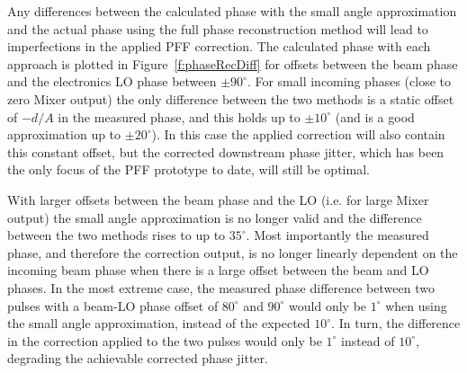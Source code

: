 Any differences between the calculated phase with the small angle
approximation and the actual phase using the full phase reconstruction
 method will lead to imperfections in the applied PFF correction.
The calculated phase with each approach is plotted in Figure~\ref{f:phaseRecDiff} for offsets between the beam phase and the electronics LO phase between \(\pm90^\circ\). For small incoming phases (close to zero Mixer output) the only difference between the two methods is a static offset of \(-d/A\) in the measured phase, and this holds up to \(\pm10^\circ\) (and is a good approximation up to \(\pm20^\circ\)). In this case the applied correction will also contain this constant offset, but the corrected downstream phase jitter, which has been the only focus of the PFF prototype to date, will still be optimal. 

With larger offsets between the beam phase and the LO (i.e. for large Mixer output) the small angle approximation is no longer valid and the difference between the two methods rises to up to \(35^\circ\). Most importantly the measured phase, and therefore the correction output, is no longer linearly dependent on the incoming beam phase when there is a large offset between the beam and LO phases. In the most extreme case, the measured phase difference between two pulses with a beam-LO phase offset of \(80^\circ\) and \(90^\circ\) would only be \(1^\circ\) when using the small angle approximation, instead of the expected \(10^\circ\). In turn, the difference in the correction applied to the two pulses would only be \(1^\circ\) instead of \(10^\circ\), degrading the achievable corrected phase jitter.

